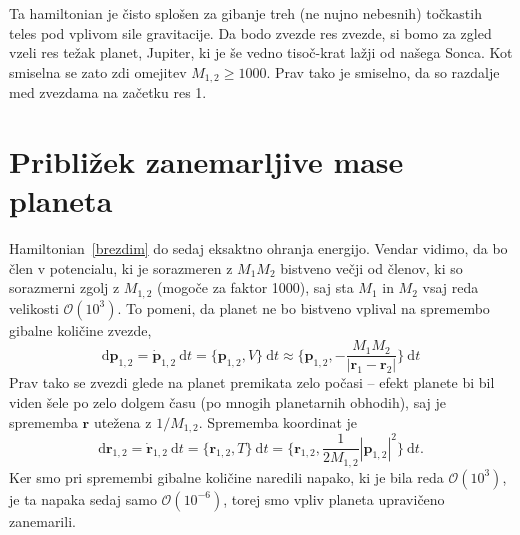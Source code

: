 \documentclass[12pt, a4paper]{article}
\renewcommand{\r}{
    \ensuremath{\mathbf{r}}
}
\newcommand{\p}{
    \ensuremath{\mathbf{p}}
}
\newcommand{\sfrac}[2]{
    \ensuremath{\textstyle{\frac{#1}{#2}}}
}
\renewcommand{\d}{
    \ensuremath{\mathrm{d}}
}
\begin{document}
Ta hamiltonian je \v cisto splo\v sen za gibanje treh (ne nujno nebesnih) to\v ckastih teles pod vplivom sile
gravitacije. Da bodo zvezde res zvezde, si bomo za zgled vzeli res te\v zak planet, Jupiter, ki je \v se
vedno tiso\v c-krat la\v zji od na\v sega Sonca. Kot smiselna se zato zdi omejitev $M_{1,2} \geq 1000$.
Prav tako je smiselno, da so razdalje med zvezdama na za\v cetku res 1.

\section{Pribli\v zek zanemarljive mase planeta}

Hamiltonian~\eqref{brezdim} do sedaj eksaktno ohranja energijo. Vendar vidimo, da bo \v clen v potencialu, ki je
sorazmeren z $M_1 M_2$ bistveno ve\v cji od \v clenov, ki so sorazmerni zgolj z $M_{1,2}$ (mogo\v ce za faktor 1000),
saj sta $M_1$ in $M_2$ vsaj reda velikosti $\mathcal{O}(10^3)$. To pomeni, da planet ne bo bistveno vplival na
spremembo gibalne koli\v cine zvezde,
\begin{equation}
    \d\p_{1,2} = \dot{\p}_{1,2}\ \d t = \{\p_{1,2}, V\}\ \d t \approx
        \Big\{\p_{1,2}, -\sfrac{M_1M_2}{|\r_1 - \r_2|}\Big\}\ \d t
\end{equation}
Prav tako se zvezdi glede na planet premikata zelo po\v casi -- efekt planete bi bil viden \v sele po zelo dolgem
\v casu (po mnogih planetarnih obhodih), saj je sprememba $\r$ ute\v zena z $1/M_{1,2}$. Sprememba koordinat
je
\begin{equation}
    \d \r_{1,2} = \dot{\r}_{1,2}\ \d t = \{\r_{1,2}, T\}\ \d t = \big\{\r_{1,2}, \sfrac{1}{2M_{1,2}}|\p_{1,2}|^2\big\}\ \d t.
\end{equation}
Ker smo pri spremembi gibalne koli\v cine naredili napako, ki je bila reda $\mathcal{O}(10^3)$, je ta napaka sedaj
samo $\mathcal{O}(10^{-6})$, torej smo vpliv planeta upravi\v ceno zanemarili.
\end{document}
